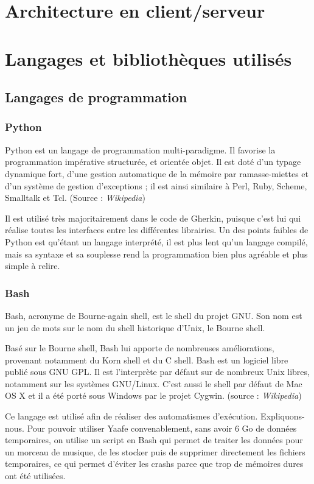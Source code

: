 \documentclass{report}
\begin{document}
\chapter{Architecture en client/serveur}


\chapter{Langages et bibliothèques utilisés}

\section{Langages de programmation}
\subsection{Python}

Python est un langage de programmation multi-paradigme. Il favorise la programmation impérative structurée, et orientée objet. Il est doté d'un typage dynamique fort, d'une gestion automatique de la mémoire par ramasse-miettes et d'un système de gestion d'exceptions ; il est ainsi similaire à Perl, Ruby, Scheme, Smalltalk et Tcl. (Source : \emph{Wikipedia})


Il est utilisé très majoritairement dans le code de Gherkin, puisque c'est lui qui réalise toutes les interfaces entre les différentes librairies. Un des points faibles de Python est qu'étant un langage interprété, il est plus lent qu'un langage compilé, mais sa syntaxe et sa souplesse rend la programmation bien plus agréable et plus simple à relire.


\subsection{Bash}
Bash, acronyme de Bourne-again shell, est le shell du projet GNU. Son nom est un jeu de mots sur le nom du shell historique d'Unix, le Bourne shell. 

Basé sur le Bourne shell, Bash lui apporte de nombreuses améliorations, provenant notamment du Korn shell et du C shell. Bash est un logiciel libre publié sous GNU GPL. Il est l'interprète par défaut sur de nombreux Unix libres, notamment sur les systèmes GNU/Linux. C'est aussi le shell par défaut de Mac OS X et il a été porté sous Windows par le projet Cygwin. (source : \emph{Wikipedia})

Ce langage est utilisé afin de réaliser des automatismes d'exécution. Expliquons-nous. Pour pouvoir utiliser Yaafe convenablement, sans avoir 6 Go de données temporaires, on utilise un script en Bash qui permet de traiter les données pour un morceau de musique, de les stocker puis de supprimer directement les fichiers temporaires, ce qui permet d'éviter les crashs parce que trop de mémoires dures ont été utilisées.
\end{document}
